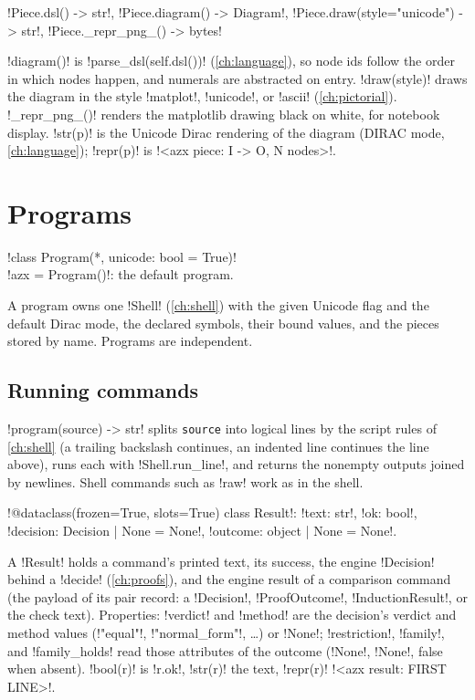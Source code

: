 \begin{signature}
\py!Piece.dsl() -> str!, \py!Piece.diagram() -> Diagram!, \code!Piece.draw(style="unicode") -> str!, \py!Piece._repr_png_() -> bytes!
\end{signature}
\py!diagram()! is \py!parse_dsl(self.dsl())! (\cref{ch:language}), so node ids follow the order in which nodes happen, and numerals are abstracted on entry. \py!draw(style)! draws the diagram in the style \code!matplot!, \code!unicode!, or \code!ascii! (\cref{ch:pictorial}). \py!_repr_png_()! renders the matplotlib drawing black on white, for notebook display. \py!str(p)! is the Unicode Dirac rendering of the diagram (DIRAC mode, \cref{ch:language}); \py!repr(p)! is \code!<azx piece: I -> O, N nodes>!.

\section{Programs}\label{sec:python-api-program}

\begin{signature}
\py!class Program(*, unicode: bool = True)!\\
\py!azx = Program()!: the default program.
\end{signature}
A program owns one \py!Shell! (\cref{ch:shell}) with the given Unicode flag and the default Dirac mode, the declared symbols, their bound values, and the pieces stored by name. Programs are independent.

\subsection{Running commands}

\py!program(source) -> str! splits \texttt{source} into logical lines by the script rules of \cref{ch:shell} (a trailing backslash continues, an indented line continues the line above), runs each with \py!Shell.run_line!, and returns the nonempty outputs joined by newlines. Shell commands such as \azx!raw! work as in the shell.

\begin{signature}
\py!@dataclass(frozen=True, slots=True) class Result!: \py!text: str!, \py!ok: bool!, \py!decision: Decision | None = None!, \py!outcome: object | None = None!.
\end{signature}
A \py!Result! holds a command's printed text, its success, the engine \py!Decision! behind a \azx!decide! (\cref{ch:proofs}), and the engine result of a comparison command (the payload of its pair record: a \py!Decision!, \py!ProofOutcome!, \py!InductionResult!, or the check text). Properties: \py!verdict! and \py!method! are the decision's verdict and method values (\code!"equal"!, \code!"normal_form"!, \ldots) or \py!None!; \py!restriction!, \py!family!, and \py!family_holds! read those attributes of the outcome (\py!None!, \py!None!, false when absent). \py!bool(r)! is \py!r.ok!, \py!str(r)! the text, \py!repr(r)! \code!<azx result: FIRST LINE>!.

